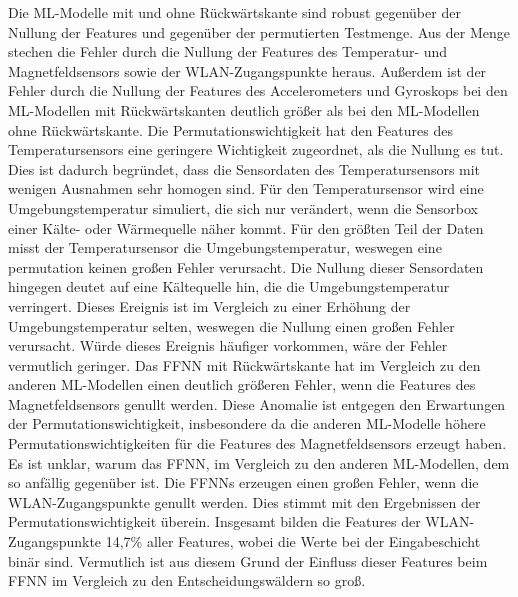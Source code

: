 \newline
\newline
Die ML-Modelle mit und ohne Rückwärtskante sind robust gegenüber der Nullung der Features und gegenüber der permutierten Testmenge.
Aus der Menge stechen die Fehler durch die Nullung der Features des Temperatur- und Magnetfeldsensors sowie der WLAN-Zugangspunkte heraus.
Außerdem ist der Fehler durch die Nullung der Features des Accelerometers und Gyroskops bei den ML-Modellen mit Rückwärtskanten
deutlich größer als bei den ML-Modellen ohne Rückwärtskante.
\newline
\newline
Die Permutationswichtigkeit hat den Features des Temperatursensors eine geringere Wichtigkeit zugeordnet, als die Nullung es tut.
Dies ist dadurch begründet, dass die Sensordaten des Temperatursensors mit wenigen Ausnahmen sehr homogen sind.
Für den Temperatursensor wird eine Umgebungstemperatur simuliert, die sich nur verändert, wenn die Sensorbox einer Kälte- oder Wärmequelle näher kommt.
Für den größten Teil der Daten misst der Temperatursensor die Umgebungstemperatur, weswegen eine permutation keinen großen Fehler verursacht.
Die Nullung dieser Sensordaten hingegen deutet auf eine Kältequelle hin, die die Umgebungstemperatur verringert.
Dieses Ereignis ist im Vergleich zu einer Erhöhung der Umgebungstemperatur selten, weswegen die Nullung einen großen Fehler verursacht.
Würde dieses Ereignis häufiger vorkommen, wäre der Fehler vermutlich geringer.
\newline
\newline
Das FFNN mit Rückwärtskante hat im Vergleich zu den anderen ML-Modellen einen deutlich größeren Fehler, wenn die Features des Magnetfeldsensors genullt werden.
Diese Anomalie ist entgegen den Erwartungen der Permutationswichtigkeit, insbesondere da die anderen ML-Modelle
höhere Permutationswichtigkeiten für die Features des Magnetfeldsensors erzeugt haben.
Es ist unklar, warum das FFNN, im Vergleich zu den anderen ML-Modellen, dem so anfällig gegenüber ist.
\newline
\newline
Die FFNNs erzeugen einen großen Fehler, wenn die WLAN-Zugangspunkte genullt werden.
Dies stimmt mit den Ergebnissen der Permutationswichtigkeit überein.
Insgesamt bilden die Features der WLAN-Zugangspunkte 14,7\% aller Features, wobei die Werte bei der Eingabeschicht binär sind.
Vermutlich ist aus diesem Grund der Einfluss dieser Features beim FFNN im Vergleich zu den Entscheidungswäldern so groß.
\newline
